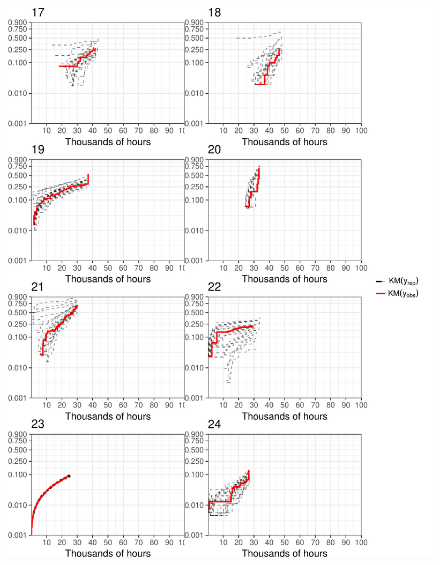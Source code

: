 \documentclass[12pt]{article}
\begin{document}
\begin{figure}[H]
\includegraphics[width=\textwidth]{ppcheck-3.pdf}
\end{figure}
\end{document}
